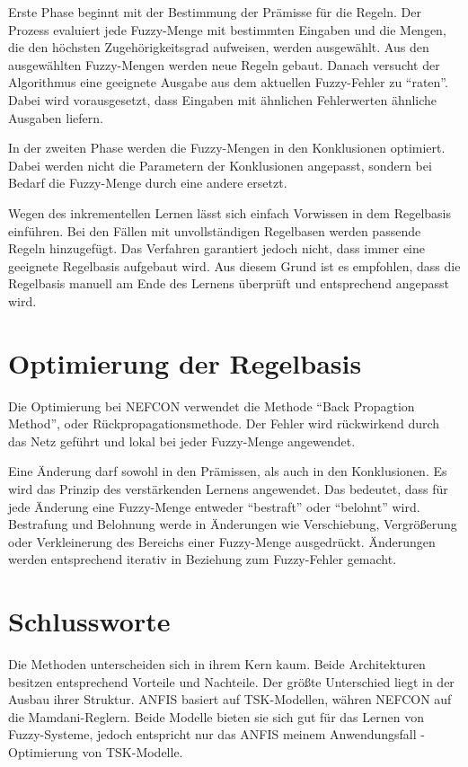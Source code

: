 Erste Phase beginnt mit der Bestimmung der Prämisse für die Regeln. Der Prozess evaluiert jede Fuzzy-Menge mit bestimmten Eingaben und die Mengen, die den höchsten Zugehörigkeitsgrad aufweisen, werden ausgewählt. Aus den ausgewählten Fuzzy-Mengen werden neue Regeln gebaut. Danach versucht der Algorithmus eine geeignete Ausgabe aus dem aktuellen Fuzzy-Fehler zu ``raten''. Dabei wird vorausgesetzt, dass Eingaben mit ähnlichen Fehlerwerten ähnliche Ausgaben liefern.

In der zweiten Phase werden die Fuzzy-Mengen in den Konklusionen optimiert. Dabei werden nicht die Parametern der Konklusionen angepasst, sondern bei Bedarf die Fuzzy-Menge durch eine andere ersetzt.

Wegen des inkrementellen Lernen lässt sich einfach Vorwissen in dem Regelbasis einführen. Bei den Fällen mit unvollständigen Regelbasen werden passende Regeln hinzugefügt. Das Verfahren garantiert jedoch nicht, dass immer eine geeignete Regelbasis aufgebaut wird. Aus diesem Grund ist es empfohlen, dass die Regelbasis manuell am Ende des Lernens überprüft und entsprechend angepasst wird. \cite{CIKruse:15} \cite{UNIMAG:97}

\section{Optimierung der Regelbasis}

Die Optimierung bei NEFCON verwendet die Methode ``Back Propagtion Method'', oder Rückpropagationsmethode. Der Fehler wird rückwirkend durch das Netz geführt und lokal bei jeder Fuzzy-Menge angewendet.

Eine Änderung darf sowohl in den Prämissen, als auch in den Konklusionen. Es wird das Prinzip des verstärkenden Lernens angewendet. Das bedeutet, dass für jede Änderung eine Fuzzy-Menge entweder ``bestraft'' oder ``belohnt'' wird. Bestrafung und Belohnung werde in Änderungen wie Verschiebung, Vergrößerung oder Verkleinerung des Bereichs einer Fuzzy-Menge ausgedrückt. Änderungen werden entsprechend iterativ in Beziehung zum Fuzzy-Fehler gemacht. \cite{CIKruse:15} \cite{UNIMAG:97}

\section{Schlussworte}

Die Methoden unterscheiden sich in ihrem Kern kaum. Beide Architekturen besitzen entsprechend Vorteile und Nachteile. Der größte Unterschied liegt in der Ausbau ihrer Struktur. ANFIS basiert auf TSK-Modellen, währen NEFCON auf die Mamdani-Reglern. Beide Modelle bieten sie sich gut für das Lernen von Fuzzy-Systeme, jedoch entspricht nur das ANFIS meinem Anwendungsfall - Optimierung von TSK-Modelle.